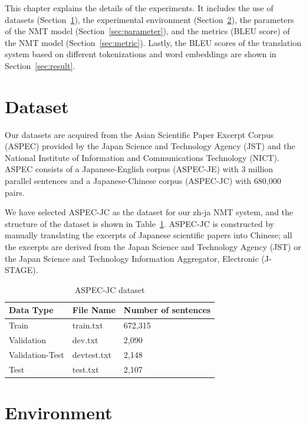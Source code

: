 \hspace{24pt}

This chapter explains the details of the experiments. It includes the use of datasets (Section~\ref{sec:dataset}), the experimental environment (Section~\ref{sec:environment}), the parameters of the NMT model (Section~\ref{sec:parameter}), and the metrics (BLEU score) of the NMT model (Section~\ref{sec:metric}). Lastly, the BLEU scores of the translation system based on different tokenizations and word embeddings are shown in Section~\ref{sec:result}.

\section{Dataset} \label{sec:dataset}

Our datasets are acquired from the Asian Scientific Paper Excerpt Corpus (ASPEC) \cite{nakazawa-etal-2016-aspec} provided by the Japan Science and Technology Agency (JST) and the National Institute of Information and Communications Technology (NICT). ASPEC consists of a Japanese-English corpus (ASPEC-JE) with 3 million parallel sentences and a Japanese-Chinese corpus (ASPEC-JC) with 680,000 pairs.

We have selected ASPEC-JC as the dataset for our zh-ja NMT system, and the structure of the dataset is shown in Table~\ref{tab:aspec-jc}. ASPEC-JC is constructed by manually translating the excerpts of Japanese scientific papers into Chinese; all the excerpts are derived from the Japan Science and Technology Agency (JST) or the Japan Science and Technology Information Aggregator, Electronic (​J-STAGE).

\vspace{0.4cm}
\begin{table}[h]
    \centering
    \begin{tabularx}{\textwidth}{bbb}\toprule
        Data Type & File Name & Number of sentences \\\midrule
        Train & train.txt & 672,315 \\
        Validation & dev.txt & 2,090 \\
        Validation-Test & devtest.txt & 2,148 \\
        Test & test.txt & 2,107 \\
        \bottomrule
    \end{tabularx}
    \caption{ASPEC-JC dataset}
    \label{tab:aspec-jc}
\end{table}

\section{Environment} \label{sec:environment}

